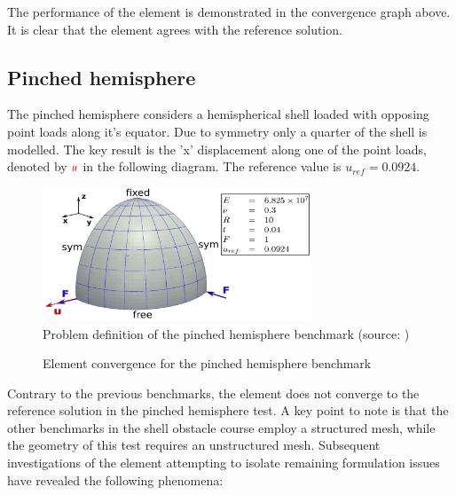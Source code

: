The performance of the element is demonstrated in the convergence graph above. It is clear that the element agrees with the reference solution.

\subsection{Pinched hemisphere}

The pinched hemisphere considers a hemispherical shell loaded with opposing point loads along it's equator. Due to symmetry only a quarter of the shell is modelled. The key result is the 'x' displacement along one of the point loads, denoted by $\textcolor{red}{u}$ in the following diagram. The reference value is $u_{ref} =  0.0924$. 

\begin{figure}[H]
	\centering
	\def\svgwidth{\columnwidth}
	\includegraphics[width=8cm]{images/pinchedhemisphere.png}
	\caption{Problem definition of the pinched hemisphere benchmark (source: \cite{Bou13})}
	\label{pinchedhemisphere}
\end{figure}

\pgfplotsset{width=6cm}
\begin{figure}[H]
	\centering
	\caption{Element convergence for the pinched hemisphere benchmark}
	\label{pinchedhemispherebench}
\end{figure}

Contrary to the previous benchmarks, the element does not converge to the reference solution in the pinched hemisphere test.  A key point to note is that the other benchmarks in the shell obstacle course employ a structured mesh, while the geometry of this test requires an unstructured mesh. Subsequent investigations of the element attempting to isolate remaining formulation issues have revealed the following phenomena:

